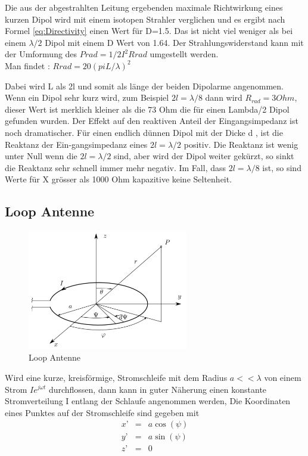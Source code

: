 Die aus der abgestrahlten Leitung ergebenden maximale Richtwirkung eines kurzen Dipol wird  mit einem isotopen Strahler verglichen und es ergibt nach Formel \ref{eq:Directivity} einen Wert für D=1.5. Das ist nicht viel weniger als bei einem $\lambda/2$ Dipol mit einem D Wert von 1.64.
Der Strahlungswiderstand kann mit der Umformung des $Prad=1/2 I^{2}Rrad$ umgestellt werden. \\
Man findet :
$Rrad=20\left(piL/\lambda\right)^{2}$

Dabei wird L als 2l und somit als länge der beiden Dipolarme angenommen.
Wenn ein Dipol sehr kurz wird, zum Beispiel $2l=\lambda/8$ dann wird $R_{rad} = 3 Ohm$, dieser Wert ist merklich kleiner als die 73 Ohm die für einen Lambda/2 Dipol gefunden wurden. Der Effekt auf den reaktiven Anteil der Eingangsimpedanz ist noch dramatischer. Für einen endlich dünnen Dipol mit der Dicke d , ist die Reaktanz der Ein-gangsimpedanz eines $2l=\lambda/2$ positiv. Die Reaktanz ist wenig unter Null wenn die $2l=\lambda/2$ sind, aber wird der Dipol weiter gekürzt, so sinkt die Reaktanz sehr schnell immer mehr negativ. Im Fall, dass $2l=\lambda/8$ ist, so sind Werte für X grösser als 1000 Ohm kapazitive keine Seltenheit. 

\subsection{Loop Antenne}

\begin{figure}[!htb]
	\centering
	\includegraphics[width=7cm]{content/bilder/Loop_EMANT_S45.pdf}%
	\caption{Loop Antenne}
	\label{LoopAntenne}
\end{figure}
Wird eine kurze, kreisförmige, Stromschleife mit dem Radius $a<<\lambda$ von einem Strom $Ie^{j\omega t}$ durchflossen, dann kann in guter Näherung einen konstante Stromverteilung I entlang der Schlaufe angenommen werden,
Die Koordinaten eines Punktes auf der Stromschleife sind gegeben mit
\begin{eqnarray}
x’ &=&a \cos(\psi)\\
y’ &=&a \sin(\psi)\\
z’ &=&0
\end{eqnarray}


